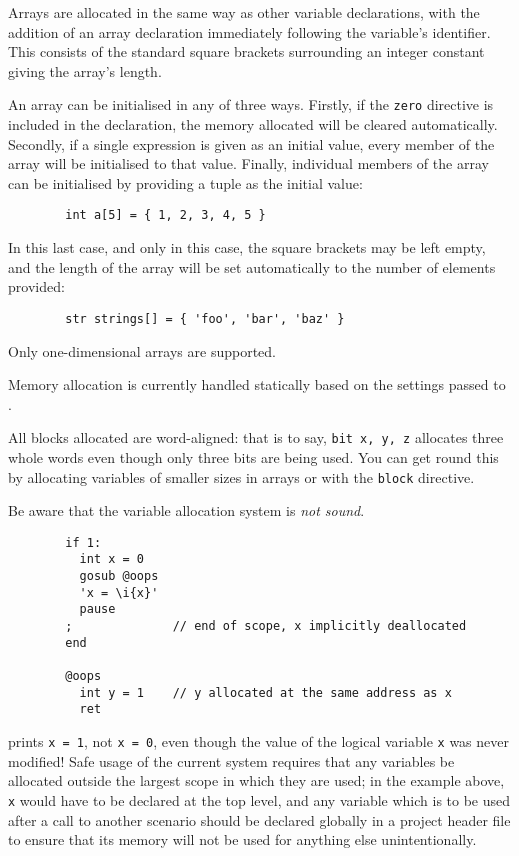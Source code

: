 
      Arrays are allocated in the same way as other variable declarations, with
      the addition of an array declaration immediately following the variable's
      identifier.  This consists of the standard square brackets surrounding
      an integer constant giving the array's length.

      An array can be initialised in any of three ways.  Firstly, if the
      \texttt{zero} directive is included in the declaration, the memory
      allocated will be cleared automatically.  Secondly, if a single expression
      is given as an initial value, every member of the array will be initialised
      to that value.  Finally, individual members of the array can be initialised
      by providing a tuple as the initial value:
      \begin{lstlisting}
        int a[5] = { 1, 2, 3, 4, 5 }
      \end{lstlisting}
      \noindent In this last case, and only in this case, the square brackets
      may be left empty, and the length of the array will be set automatically to
      the number of elements provided:
      \begin{lstlisting}
        str strings[] = { 'foo', 'bar', 'baz' }
      \end{lstlisting}

      Only one-dimensional arrays are supported.


      Memory allocation is currently handled statically based on the settings
      passed to .

      All blocks allocated are word-aligned: that is to say, 
      \lstinline|bit x, y, z| allocates three whole words even though only three 
      bits are being used.  You can get round this by allocating variables of 
      smaller sizes in arrays or with the \texttt{block} directive.

      Be aware that the variable allocation system is \emph{not sound}.
      \begin{lstlisting}
        if 1:
          int x = 0
          gosub @oops
          'x = \i{x}'
          pause
        ;              // end of scope, x implicitly deallocated
        end

        @oops
          int y = 1    // y allocated at the same address as x
          ret
      \end{lstlisting}
      \noindent prints \lstinline|x = 1|, not \lstinline|x = 0|, even though
      the value of the logical variable \lstinline|x| was never modified!
      Safe usage of the current system requires that any variables be allocated
      outside the largest scope in which they are used; in the example above,
      \lstinline|x| would have to be declared at the top level, and any variable
      which is to be used after a call to another scenario should be declared
      globally in a project header file to ensure that its memory will not be
      used for anything else unintentionally.

